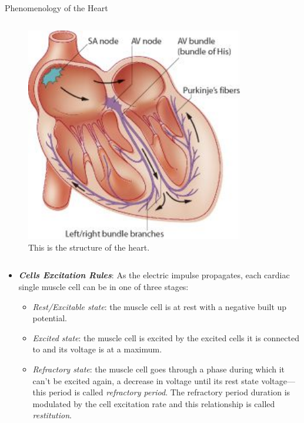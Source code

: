 \documentclass[final,hyperref={pdfpagelabels=false}]{beamer}
\begin{document}
\begin{frame}[t]
\begin{columns}[t]
\begin{column}{.465\textwidth}
\begin{block}{Phenomenology of the Heart}
\begin{columns}
\begin{column}{.43\textwidth}
	\begin{figure}
	
	
	\includegraphics[width=0.85\textwidth]{heart}
	\caption{\label{fig:heart}This is the structure of the heart.}
	\end{figure}
\end{column}
\end{columns}
\begin{itemize}

	\item \textbf{ \textit{Cells Excitation Rules}}: As the electric impulse propagates, each cardiac single muscle cell can be in one of three stages:

		\begin{itemize}
 		 \item \textit{Rest/Excitable state}: the muscle cell is at rest with a negative built up potential.
  										
  		\item \textit{Excited state}: the muscle cell is excited by the excited cells it is connected to and its voltage is at a maximum. 
  		\item \textit{Refractory state}: the muscle cell goes through a phase during which it can't be excited again, a decrease in voltage until its rest state voltage---this period is called \textit{refractory period}. The refractory period duration is modulated by the cell excitation rate and this relationship is called \textit{restitution}.
		\end{itemize}  


\end{itemize}
\end{block}
\end{column}
\end{columns}
\end{frame}
\end{document}
